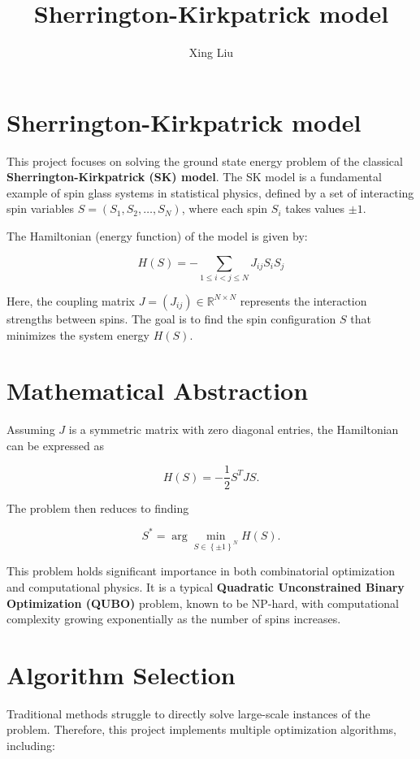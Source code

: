 \documentclass{article}
\title{Sherrington-Kirkpatrick model}
\author{Xing Liu}
\date{}
\begin{document}
\maketitle

\section*{Sherrington-Kirkpatrick model}

This project focuses on solving the ground state energy problem of the classical \textbf{Sherrington-Kirkpatrick (SK) model}. The SK model is a fundamental example of spin glass systems in statistical physics, defined by a set of interacting spin variables $S = \left(S_{1}, S_{2}, \dots, S_{N}\right)$, where each spin $S_{i}$ takes values $\pm 1$.

The Hamiltonian (energy function) of the model is given by:

\[
H(S) = - \sum_{1 \leq i < j \leq N} J_{ij} S_{i} S_{j}
\]

Here, the coupling matrix $J = \left(J_{ij}\right) \in \mathbb{R}^{N \times N}$ represents the interaction strengths between spins. The goal is to find the spin configuration $S$ that minimizes the system energy $H\left(S\right)$.

\section*{Mathematical Abstraction}

Assuming $J$ is a symmetric matrix with zero diagonal entries, the Hamiltonian can be expressed as

\[
H\left(S\right) = -\frac{1}{2} S^{T} J S.
\]

The problem then reduces to finding

\[
S^{*} = \arg \min_{S \in \left\{\pm 1\right\}^N} H\left(S\right).
\]

This problem holds significant importance in both combinatorial optimization and computational physics. It is a typical \textbf{Quadratic Unconstrained Binary Optimization (QUBO)} problem, known to be NP-hard, with computational complexity growing exponentially as the number of spins increases.

\section*{Algorithm Selection}

Traditional methods struggle to directly solve large-scale instances of the problem. Therefore, this project implements multiple optimization algorithms, including:
\end{document}
